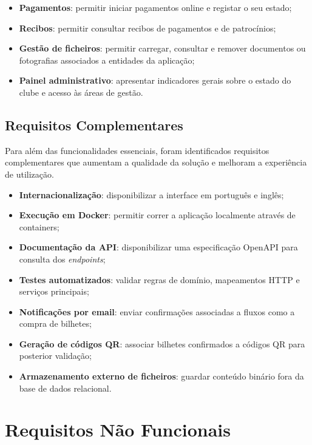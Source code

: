 \begin{itemize}
    validação de condições de sócio quando aplicável;
    \item \textbf{Pagamentos}: permitir iniciar pagamentos online e registar o
    seu estado;
    \item \textbf{Recibos}: permitir consultar recibos de pagamentos e de
    patrocínios;
    \item \textbf{Gestão de ficheiros}: permitir carregar, consultar e remover
    documentos ou fotografias associados a entidades da aplicação;
    \item \textbf{Painel administrativo}: apresentar indicadores gerais sobre
    o estado do clube e acesso às áreas de gestão.
\end{itemize}

\subsection{Requisitos Complementares}

Para além das funcionalidades essenciais, foram identificados requisitos
complementares que aumentam a qualidade da solução e melhoram a experiência de
utilização.

\begin{itemize}
    \item \textbf{Internacionalização}: disponibilizar a interface em português
    e inglês;
    \item \textbf{Execução em Docker}: permitir correr a aplicação localmente
    através de containers;
    \item \textbf{Documentação da API}: disponibilizar uma especificação
    OpenAPI para consulta dos \textit{endpoints};
    \item \textbf{Testes automatizados}: validar regras de domínio,
    mapeamentos HTTP e serviços principais;
    \item \textbf{Notificações por email}: enviar confirmações associadas a
    fluxos como a compra de bilhetes;
    \item \textbf{Geração de códigos QR}: associar bilhetes confirmados a
    códigos QR para posterior validação;
    \item \textbf{Armazenamento externo de ficheiros}: guardar conteúdo binário
    fora da base de dados relacional.
\end{itemize}

\section{Requisitos Não Funcionais}

